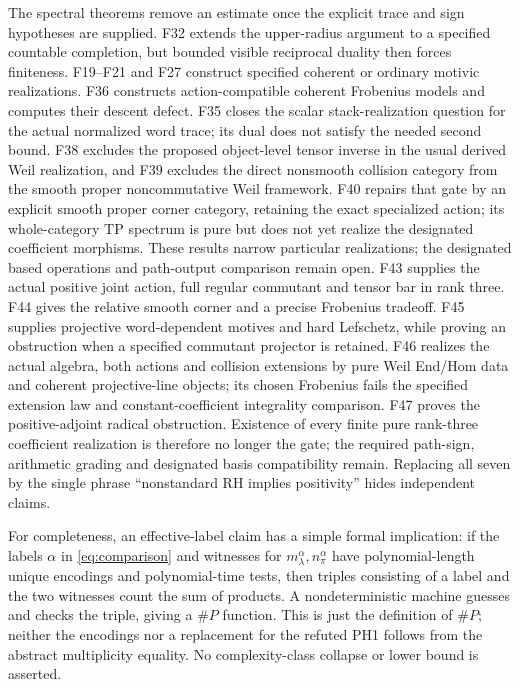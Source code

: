 The spectral theorems remove an estimate once the explicit trace and sign hypotheses are supplied. F32 extends the upper-radius argument to a specified countable completion, but bounded visible reciprocal duality then forces finiteness. F19--F21 and F27 construct specified coherent or ordinary motivic realizations. F36 constructs action-compatible coherent Frobenius models and computes their descent defect. F35 closes the scalar stack-realization question for the actual normalized word trace; its dual does not satisfy the needed second bound. F38 excludes the proposed object-level tensor inverse in the usual derived Weil realization, and F39 excludes the direct nonsmooth collision category from the smooth proper noncommutative Weil framework. F40 repairs that gate by an explicit smooth proper corner category, retaining the exact specialized action; its whole-category TP spectrum is pure but does not yet realize the designated coefficient morphisms. These results narrow particular realizations; the designated based operations and path-output comparison remain open.  F43 supplies the actual positive joint action, full regular
commutant and tensor bar in rank three. F44 gives the relative
smooth corner and a precise Frobenius tradeoff. F45 supplies
projective word-dependent motives and hard Lefschetz, while proving
an obstruction when a specified commutant projector is retained.
F46 realizes the actual algebra, both actions and collision
extensions by pure Weil End/Hom data and coherent projective-line
objects; its chosen Frobenius fails the specified extension law
and constant-coefficient integrality comparison. F47 proves the
positive-adjoint radical obstruction. Existence of every finite
pure rank-three coefficient realization is therefore no longer
the gate; the required path-sign, arithmetic grading and
designated basis compatibility remain. Replacing all seven by the single phrase ``nonstandard RH implies positivity'' hides independent claims.

For completeness, an effective-label claim has a simple formal implication: if the labels $\alpha$ in \eqref{eq:comparison} and witnesses for $m_\lambda^\alpha,n_\pi^\alpha$ have polynomial-length unique encodings and polynomial-time tests, then triples consisting of a label and the two witnesses count the sum of products. A nondeterministic machine guesses and checks the triple, giving a \(\#P\) function. This is just the definition of \(\#P\); neither the encodings nor a replacement for the refuted PH1 follows from the abstract multiplicity equality. No complexity-class collapse or lower bound is asserted.

